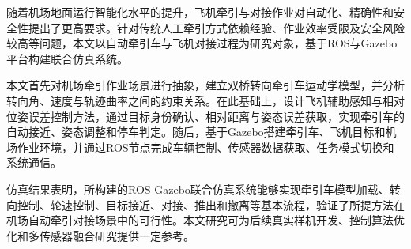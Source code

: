 \begin{abstractzh}
随着机场地面运行智能化水平的提升，飞机牵引与对接作业对自动化、精确性和安全性提出了更高要求。针对传统人工牵引方式依赖经验、作业效率受限及安全风险较高等问题，本文以自动牵引车与飞机对接过程为研究对象，基于ROS与Gazebo平台构建联合仿真系统。

本文首先对机场牵引作业场景进行抽象，建立双桥转向牵引车运动学模型，并分析转向角、速度与轨迹曲率之间的约束关系。在此基础上，设计飞机辅助感知与相对位姿误差控制方法，通过目标身份确认、相对距离与姿态误差获取，实现牵引车的自动接近、姿态调整和停车判定。随后，基于Gazebo搭建牵引车、飞机目标和机场作业环境，并通过ROS节点完成车辆控制、传感器数据获取、任务模式切换和系统通信。

仿真结果表明，所构建的ROS-Gazebo联合仿真系统能够实现牵引车模型加载、转向控制、轮速控制、目标接近、对接、推出和撤离等基本流程，验证了所提方法在机场自动牵引对接场景中的可行性。本文研究可为后续真实样机开发、控制算法优化和多传感器融合研究提供一定参考。
    
    


\end{abstractzh}
